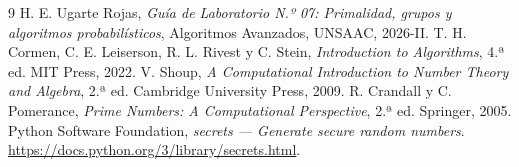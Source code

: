 \begin{thebibliography}{9}
 H. E. Ugarte Rojas, \emph{Guía de Laboratorio N.º 07: Primalidad, grupos y algoritmos probabilísticos}, Algoritmos Avanzados, UNSAAC, 2026-II.
 T. H. Cormen, C. E. Leiserson, R. L. Rivest y C. Stein, \emph{Introduction to Algorithms}, 4.ª ed. MIT Press, 2022.
 V. Shoup, \emph{A Computational Introduction to Number Theory and Algebra}, 2.ª ed. Cambridge University Press, 2009.
 R. Crandall y C. Pomerance, \emph{Prime Numbers: A Computational Perspective}, 2.ª ed. Springer, 2005.
 Python Software Foundation, \emph{secrets --- Generate secure random numbers}. \url{https://docs.python.org/3/library/secrets.html}.
\end{thebibliography}
